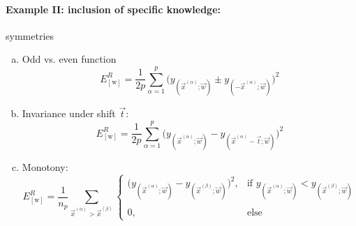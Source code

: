 \paragraph{Example II: inclusion of specific knowledge:} symmetries
\begin{enumerate}[(a)]
\item Odd vs. even function
\begin{equation}
	E_{[\mathrm{w}]}^R = \frac{1}{2p} \sum_{\alpha = 1}^p 
		\Big( y_{(\vec{x}^{(\alpha)}; \vec{w})} 
			\pm y_{(-\vec{x}^{(\alpha)}; \vec{w})} 
		\Big)^2
\end{equation}
\item Invariance under shift $\vec{t}$:
\begin{equation}
	E_{[\mathrm{w}]}^R = \frac{1}{2p} \sum_{\alpha = 1}^p 
		\Big( y_{(\vec{x}^{(\alpha)}; \vec{w})} 
			- y_{(\vec{x}^{(\alpha)} - \vec{t}; \vec{w})} 
		\Big)^2
\end{equation}
\item Monotony:
\begin{equation}
	E_{[\mathrm{w}]}^R = \frac{1}{n_p} \sum_{
		\vec{x}^{(\alpha)} > \vec{x}^{(\beta)}} 
	\left \{
	\begin{array}{ll}
		\Big( y_{(\vec{x}^{(\alpha)}; \vec{w})} - 
			y_{(\vec{x}^{(\beta)}; \vec{w})} \Big)^2,  
		& \text{if } y_{(\vec{x}^{(\alpha)}; \vec{w})} < 
			y_{(\vec{x}^{(\beta)}; \vec{w})} \\\\
		0, & \text{else}
	\end{array} \right.
\end{equation}
\end{enumerate}

